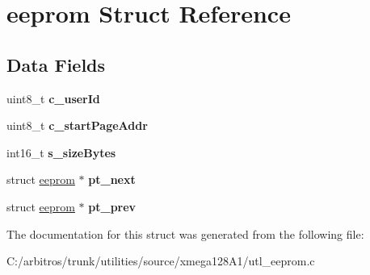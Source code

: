 \hypertarget{structeeprom}{\section{eeprom Struct Reference}
\label{structeeprom}
}
\subsection*{Data Fields}
\begin{DoxyCompactItemize}
\item 
\hypertarget{structeeprom_a2a1d740f7d94119ed71fa71ac11fe71f}{uint8\-\_\-t {\bfseries c\-\_\-user\-Id}}\label{structeeprom_a2a1d740f7d94119ed71fa71ac11fe71f}

\item 
\hypertarget{structeeprom_a165d1da4013945e4e6a1a8b2f3a84349}{uint8\-\_\-t {\bfseries c\-\_\-start\-Page\-Addr}}\label{structeeprom_a165d1da4013945e4e6a1a8b2f3a84349}

\item 
\hypertarget{structeeprom_a979ea932d34fda8eaf1b1216fd4d0d9a}{int16\-\_\-t {\bfseries s\-\_\-size\-Bytes}}\label{structeeprom_a979ea932d34fda8eaf1b1216fd4d0d9a}

\item 
\hypertarget{structeeprom_ae9defadc0b153c6091d7f23bcb95ef22}{struct \hyperlink{structeeprom}{eeprom} $\ast$ {\bfseries pt\-\_\-next}}\label{structeeprom_ae9defadc0b153c6091d7f23bcb95ef22}

\item 
\hypertarget{structeeprom_a3aecd98f8fcd3681ab58dcc5042658ad}{struct \hyperlink{structeeprom}{eeprom} $\ast$ {\bfseries pt\-\_\-prev}}\label{structeeprom_a3aecd98f8fcd3681ab58dcc5042658ad}

\end{DoxyCompactItemize}


The documentation for this struct was generated from the following file\-:\begin{DoxyCompactItemize}
\item 
C\-:/arbitros/trunk/utilities/source/xmega128\-A1/utl\-\_\-eeprom.\-c\end{DoxyCompactItemize}
